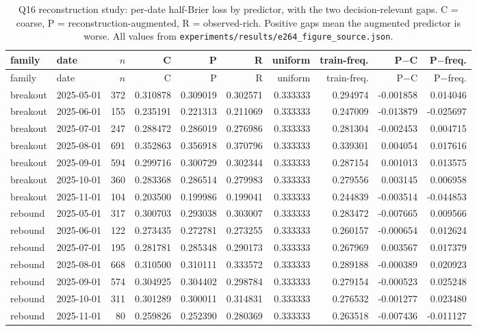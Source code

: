 \begin{longtable}{llrrrrrrrr}
\caption{Q16 reconstruction study: per-date half-Brier loss by predictor, with the two
decision-relevant gaps. C = coarse, P = reconstruction-augmented, R = observed-rich.
Positive gaps mean the augmented predictor is worse. All values from
\texttt{experiments/results/e264\_figure\_source.json}.}
\label{tab:recon}\\
\toprule
family & date & $n$ & C & P & R & uniform & train-freq. & P$-$C & P$-$freq. \\
\midrule
\endfirsthead
\toprule
family & date & $n$ & C & P & R & uniform & train-freq. & P$-$C & P$-$freq. \\
\midrule
\endhead
\bottomrule
\endfoot
breakout & 2025-05-01 & 372 & 0.310878 & 0.309019 & 0.302571 & 0.333333 & 0.294974 & -0.001858 & 0.014046 \\
breakout & 2025-06-01 & 155 & 0.235191 & 0.221313 & 0.211069 & 0.333333 & 0.247009 & -0.013879 & -0.025697 \\
breakout & 2025-07-01 & 247 & 0.288472 & 0.286019 & 0.276986 & 0.333333 & 0.281304 & -0.002453 & 0.004715 \\
breakout & 2025-08-01 & 691 & 0.352863 & 0.356918 & 0.370796 & 0.333333 & 0.339301 & 0.004054 & 0.017616 \\
breakout & 2025-09-01 & 594 & 0.299716 & 0.300729 & 0.302344 & 0.333333 & 0.287154 & 0.001013 & 0.013575 \\
breakout & 2025-10-01 & 360 & 0.283368 & 0.286514 & 0.279983 & 0.333333 & 0.279556 & 0.003145 & 0.006958 \\
breakout & 2025-11-01 & 104 & 0.203500 & 0.199986 & 0.199041 & 0.333333 & 0.244839 & -0.003514 & -0.044853 \\
rebound & 2025-05-01 & 317 & 0.300703 & 0.293038 & 0.303007 & 0.333333 & 0.283472 & -0.007665 & 0.009566 \\
rebound & 2025-06-01 & 122 & 0.273435 & 0.272781 & 0.273255 & 0.333333 & 0.260157 & -0.000654 & 0.012624 \\
rebound & 2025-07-01 & 195 & 0.281781 & 0.285348 & 0.290173 & 0.333333 & 0.267969 & 0.003567 & 0.017379 \\
rebound & 2025-08-01 & 668 & 0.310500 & 0.310111 & 0.333572 & 0.333333 & 0.289188 & -0.000389 & 0.020923 \\
rebound & 2025-09-01 & 574 & 0.304925 & 0.304402 & 0.298784 & 0.333333 & 0.279154 & -0.000523 & 0.025248 \\
rebound & 2025-10-01 & 311 & 0.301289 & 0.300011 & 0.314831 & 0.333333 & 0.276532 & -0.001277 & 0.023480 \\
rebound & 2025-11-01 & 80 & 0.259826 & 0.252390 & 0.280369 & 0.333333 & 0.263518 & -0.007436 & -0.011127 \\
\end{longtable}
